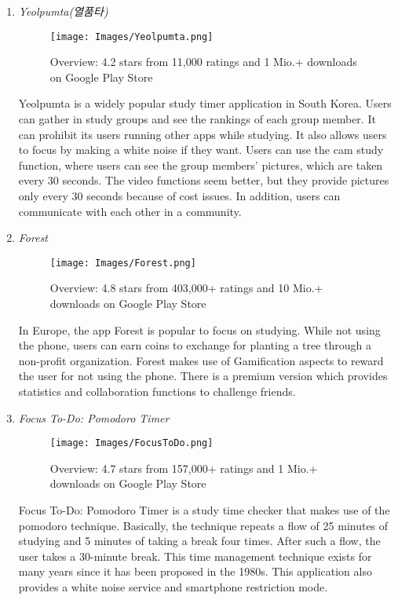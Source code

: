 \documentclass[conference]{IEEEtran}
\begin{document}
\begin{enumerate}
\item \textit{Yeolpumta(열품타)}

\begin{figure}[H]
    \centering
    \texttt{[image: Images/Yeolpumta.png]}
    \caption{Overview: 4.2 stars from 11,000 ratings and 1 Mio.+ downloads on Google Play Store}
\end{figure}

Yeolpumta is a widely popular study timer application in South Korea. Users can gather in study groups and see the rankings of each group member. It can prohibit its users running other apps while studying. It also allows users to focus by making a white noise if they want. Users can use the cam study function, where users can see the group members’ pictures, which are taken every 30 seconds. The video functions seem better, but they provide pictures only every 30 seconds because of cost issues. In addition, users can communicate with each other in a community.\\

\item \textit{Forest}

\begin{figure}[H]
    \centering
    \texttt{[image: Images/Forest.png]}
    \caption{Overview: 4.8 stars from 403,000+ ratings and 10 Mio.+ downloads on Google Play Store}
\end{figure}

In Europe, the app Forest is popular to focus on studying. While not using the phone, users can earn coins to exchange for planting a tree through a non-profit organization. Forest makes use of Gamification aspects to reward the user for not using the phone. There is a premium version which provides statistics and collaboration functions to challenge friends.\\

\item \textit{Focus To-Do: Pomodoro Timer}

\begin{figure}[H]
    \centering
    \texttt{[image: Images/FocusToDo.png]}
    \caption{Overview: 4.7 stars from 157,000+ ratings and 1 Mio.+ downloads on Google Play Store}
\end{figure}

Focus To-Do: Pomodoro Timer is a study time checker that makes use of the pomodoro technique. Basically, the technique repeats a flow of 25 minutes of studying and 5 minutes of taking a break four times. After such a flow, the user takes a 30-minute break. This time management technique exists for many years since it has been proposed in the 1980s. This application also provides a white noise service and smartphone restriction mode.\\


\end{enumerate}
\end{document}
